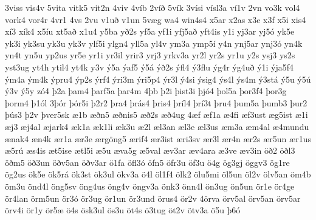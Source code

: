 {3viss
vis4v
5vita
vitk5
vit2n
4viv
4víb
2víð
5vík
3vísi
vísl3a
ví1v
2vn
vo3k
vol4
vork4
vor4r
4vr1
4vs
2vu
v1uð
v1un
5væg
wa4
win4s4
x5ar
x2as
x3e
x3f
x5i
xis4
xí3
xík4
x5íu
xt5að
x1u4
y5ba
yð2s
yf5a
yf1i
yfj5að
yft4is
y1i
yj3ar
yj5ó
yk5e
yk3i
yk3su
yk3u
yk3v
ylf5i
ylgn4
yll5a
yl4v
ym3a
ymp5í
y4n
ynj5ar
ynj3ó
yn4k
yn4t
yn5u
yp2us
yr5e
yr1i
yr3il
yrir3
yrj3
yrkv3a
yr2l
yr2s
yr1u
y2s
ysj3
ys2s
yst3ug
yt4h
ytil4
yt4k
y3v
ý5a
ýaf5
ý5á
ýð2s
ýfl4
ý3flu
ýg4r
ýg4uð
ý1i
ýja5f4
ým4a
ým4k
ýpru4
ýp2s
ýrf4
ýri3m
ýri5p4
ýr3l
ý4si
ýsig4
ýs4l
ýs4m
ý3stá
ý5u
ý5ú
ý3v
ý5y
zó4
þ2a
þam4
þarf5a
þar4m
4þb
þ2i
þist3i
þjó4
þol5a
þor3f4
þor3g
þorm4
þ1ól
3þór
þór5i
þ2r2
þra4
þrás4
þris4
þríl4
þrí3t
þru4
þum5a
þumb3
þur2
þús3
þ2v
þver5sk
æ1b
æðn5
æðnis5
æð2s
æð4ug
4æf
æf1a
æ4fi
æf3ust
æg5ist
æ1i
æj3
æj4al
æjark4
æk1a
æk1li
æk3u
æ2l
æl3an
æl3e
æl3us
æm3a
æm4al
æ4mundu
ænak4
æn4k
ær1a
ær3e
ærgöng5
ærif4
ær3ist
æri3sv
ær3l
ær4n
ær2s
ær5un
ær1us
æ5rú
æs4is
æt5ise
ætl5i
æ5u
æva5g
æ5val
æv3ar
æv4ara
æ3ve
æv3in
öð2
öðl3
öðm5
öð3un
öðv5an
öðv3ar
ö1fa
öfl3ó
öfn5
öfr3u
öf3u
ö4g
ög3gj
öggv3
ög1re
ög2us
ök5e
ök5rá
ök3st
ök3ul
ökv3a
ö4l
öl1f4
ölk2
ölu5mi
öl5un
öl2v
ölv5an
öm4b
öm3u
önd4l
öng5sv
öng4us
öng4v
öngv3a
önk3
önn4l
ön3ug
ön5un
ör1e
ör4ge
ör4lan
örm5un
ör3ó
ör3ug
ör1un
ör3und
örus4
ör2v
4örva
örv5al
örv5an
örv5ar
örv4i
ör1y
ör5æ
ö4s
ösk3ul
ös3u
öt4s
ö3tug
öt2v
ötv3a
ö5u
þ6ó
}
